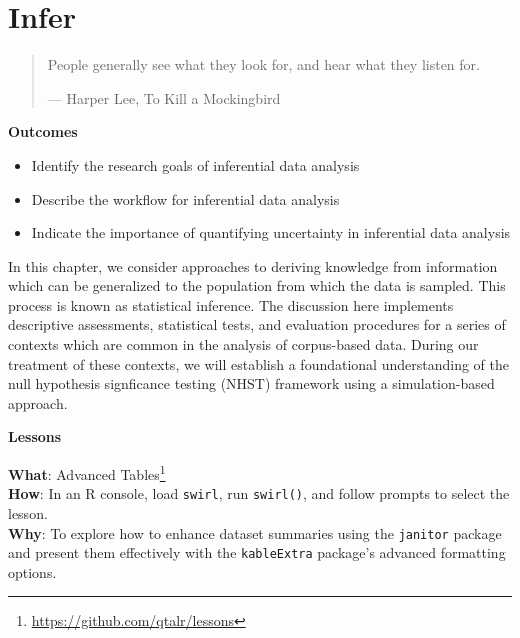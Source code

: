 \documentclass[
  letterpaper,
]{latex/krantz}
\providecommand{\tightlist}{%
  \setlength{\itemsep}{0pt}\setlength{\parskip}{0pt}}\usepackage{longtable,booktabs,array}
\theoremstyle{definition}
\theoremstyle{remark}
\DeclareRobustCommand{\href}[2]{#2\footnote{\url{#1}}}
\begin{document}
\chapter{Infer}\label{sec-infer-chapter}

\begin{quote}
People generally see what they look for, and hear what they listen for.

--- Harper Lee, To Kill a Mockingbird
\end{quote}

\begin{tcolorbox}[enhanced jigsaw, toprule=.15mm, breakable, colback=white, opacityback=0, leftrule=.75mm, bottomrule=.15mm, colframe=quarto-callout-color-frame, left=2mm, arc=.35mm, rightrule=.15mm]

\textbf{ Outcomes}

\begin{itemize}
\tightlist
\item
  Identify the research goals of inferential data analysis
\item
  Describe the workflow for inferential data analysis
\item
  Indicate the importance of quantifying uncertainty in inferential data
  analysis
\end{itemize}

\end{tcolorbox}

In this chapter, we consider approaches to deriving knowledge from
information which can be generalized to the population from which the
data is sampled. This process is known as statistical inference. The
discussion here implements descriptive assessments, statistical tests,
and evaluation procedures for a series of contexts which are common in
the analysis of corpus-based data. During our treatment of these
contexts, we will establish a foundational understanding of the null
hypothesis signficance testing (NHST) framework using a simulation-based
approach.

\begin{tcolorbox}[enhanced jigsaw, toprule=.15mm, breakable, colback=white, opacityback=0, leftrule=.75mm, bottomrule=.15mm, colframe=quarto-callout-color-frame, left=2mm, arc=.35mm, rightrule=.15mm]

\textbf{ Lessons}

\textbf{What}: \href{https://github.com/qtalr/lessons}{Advanced
Tables}\\
\textbf{How}: In an R console, load \texttt{swirl}, run
\texttt{swirl()}, and follow prompts to select the lesson.\\
\textbf{Why}: To explore how to enhance dataset summaries using the
\texttt{janitor} package and present them effectively with the
\texttt{kableExtra} package's advanced formatting options.

\end{tcolorbox}
\end{document}
